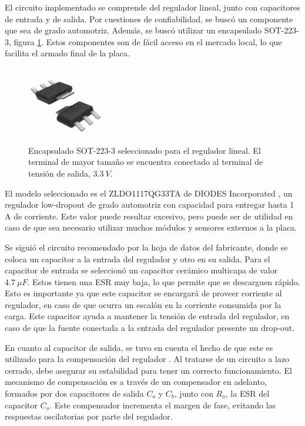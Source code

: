 El circuito implementado se comprende del regulador lineal, junto con capacitores de entrada y de salida. Por cuestiones de confiabilidad, se buscó un componente que sea de grado automotriz. Además, se buscó utilizar un encapsulado SOT-223-3, figura \ref{fig:sot_223_3}. Estos componentes son de fácil acceso en el mercado local, lo que facilita el armado final de la placa.

\begin{figure}[H]
    \centering
    \includegraphics[width=0.3\textwidth]{img/sot_223_3.png}
    \caption{Encapsulado SOT-223-3 seleccionado para el regulador lineal. El terminal de mayor tamaño se encuentra conectado al terminal de tensión de salida, $3.3 \ V$.}
    \label{fig:sot_223_3}
\end{figure}

El modelo seleccionado es el ZLDO1117QG33TA de DIODES Incorporated \cite{ZLDO1117QG33TA}, un regulador low-dropout de grado automotriz con capacidad para entregar hasta 1 A de corriente. Este valor puede resultar excesivo, pero puede ser de utilidad en caso de que sea necesario utilizar muchos módulos y sensores externos a la placa.

Se siguió el circuito recomendado por la hoja de datos del fabricante, donde se coloca un capacitor a la entrada del regulador y otro en su salida. Para el capacitor de entrada se seleccionó un capacitor cerámico multicapa de valor $4.7 \ \mu F$. Estos tienen una ESR muy baja, lo que permite que se descarguen rápido. Esto es importante ya que este capacitor se encargará de proveer corriente al regulador, en caso de que ocurra un escalón en la corriente consumida por la carga. Este capacitor ayuda a mantener la tensión de entrada del regulador, en caso de que la fuente conectada a la entrada del regulador presente un drop-out. 

En cuanto al capacitor de salida, se tuvo en cuenta el hecho de que este es utilizado para la compensación del regulador \cite{TOSHIBALDO}. Al tratarse de un circuito a lazo cerrado, debe asegurar su estabilidad para tener un correcto funcionamiento. El mecanismo de compensación es a través de un compensador en adelanto, formados por dos capacitores de salida $C_o$ y $C_b$, junto con $R_o$, la ESR del capacitor $C_o$. Este compensador incrementa el margen de fase, evitando las respuestas oscilatorias por parte del regulador.


